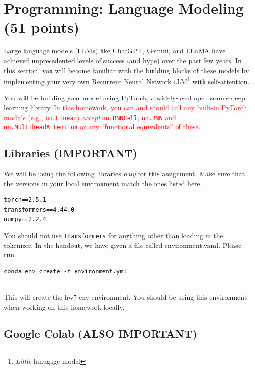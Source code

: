 \documentclass[11pt,addpoints,answers]{exam}
\begin{document}
\begin{your_solution}[height=6cm]

\end{your_solution}

\newpage
\section{Programming: Language Modeling (51 points)}
\label{programming}

Large language models (LLMs) like ChatGPT, Gemini, and LLaMA have achieved unprecedented levels of success (and hype) over the past few years. In this section, you will become familiar with the building blocks of these models by implementing your very own Recurrent Neural Network \textsc{l}LM\footnote{\textit{Little} lanugage model} with self-attention.

You will be building your model using PyTorch, a widely-used open source deep learning library. \textcolor{red}{In this homework, you can and should call any built-in PyTorch module (e.g., \texttt{nn.Linear}) \textit{except} \texttt{nn.RNNCell}, \texttt{nn.RNN} and \texttt{nn.MultiheadAttention} or any “functional equivalents” of these.}



\subsection{Libraries (IMPORTANT)}

We will be using the following libraries \textit{only} for this assignment. Make sure that the versions in your local environment match the ones listed here.

\begin{lstlisting}
torch==2.5.1
transformers==4.44.0
numpy==2.2.4
\end{lstlisting}

You should not use \texttt{transformers} for anything other than loading in the tokenizer. In the handout, we have given a file called environment.yaml. Please run \begin{lstlisting}
conda env create -f environment.yml
    
\end{lstlisting}
This will create the hw7-env environment. You should be using this environment when working on this homework locally.
\subsection{Google Colab (ALSO IMPORTANT)}
\end{document}
